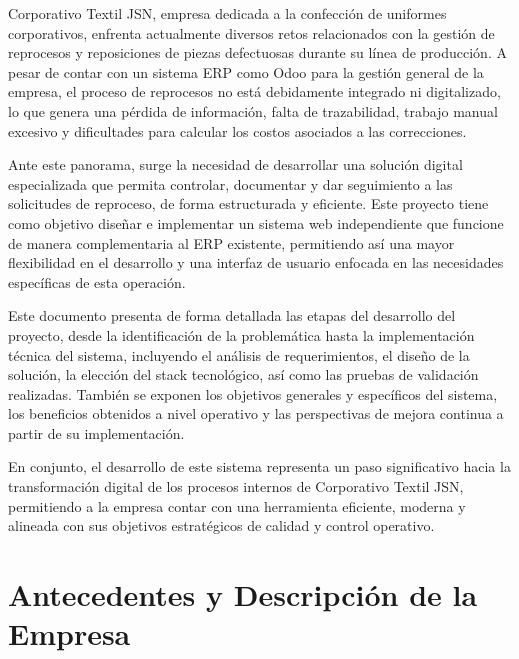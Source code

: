 \documentclass[12pt,letterpaper,spanish]{report}
\begin{document}
Corporativo Textil JSN, empresa dedicada a la confección de uniformes corporativos, enfrenta actualmente diversos retos relacionados con la gestión de reprocesos y reposiciones de piezas defectuosas durante su línea de producción. A pesar de contar con un sistema ERP como Odoo para la gestión general de la empresa, el proceso de reprocesos no está debidamente integrado ni digitalizado, lo que genera una pérdida de información, falta de trazabilidad, trabajo manual excesivo y dificultades para calcular los costos asociados a las correcciones.

Ante este panorama, surge la necesidad de desarrollar una solución digital especializada que permita controlar, documentar y dar seguimiento a las solicitudes de reproceso, de forma estructurada y eficiente. Este proyecto tiene como objetivo diseñar e implementar un sistema web independiente que funcione de manera complementaria al ERP existente, permitiendo así una mayor flexibilidad en el desarrollo y una interfaz de usuario enfocada en las necesidades específicas de esta operación.

Este documento presenta de forma detallada las etapas del desarrollo del proyecto, desde la identificación de la problemática hasta la implementación técnica del sistema, incluyendo el análisis de requerimientos, el diseño de la solución, la elección del stack tecnológico, así como las pruebas de validación realizadas. También se exponen los objetivos generales y específicos del sistema, los beneficios obtenidos a nivel operativo y las perspectivas de mejora continua a partir de su implementación.

En conjunto, el desarrollo de este sistema representa un paso significativo hacia la transformación digital de los procesos internos de Corporativo Textil JSN, permitiendo a la empresa contar con una herramienta eficiente, moderna y alineada con sus objetivos estratégicos de calidad y control operativo.






\chapter{Antecedentes y Descripción de la Empresa}
\newpage
\end{document}
